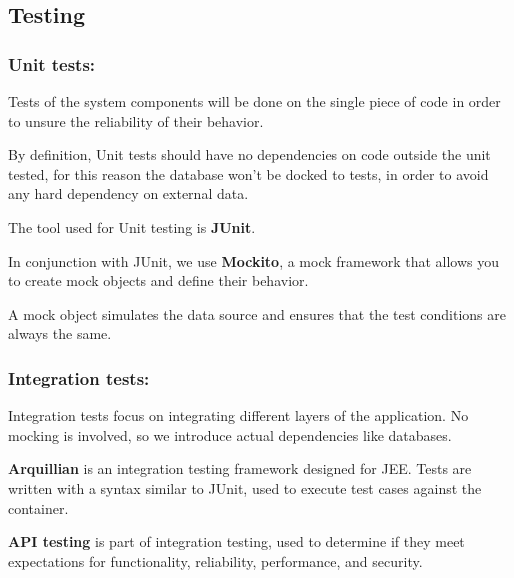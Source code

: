 \newpage

\subsection{Testing}

\subsubsection{Unit tests:}
Tests of the system components will be done on the single piece of code in order to unsure the reliability of their behavior.

By definition, Unit tests should have no dependencies on code outside the unit tested, for this reason the database won’t be docked to tests, in order to avoid any hard dependency on external data.

The tool used for Unit testing is \textbf{JUnit}.

In conjunction with JUnit, we use \textbf{Mockito}, a mock framework that allows you to create mock objects and define their behavior.

A mock object simulates the data source and ensures that the test conditions are always the same.


\subsubsection{Integration tests:}
Integration tests focus on integrating different layers of the application. No mocking is involved, so we introduce actual dependencies like databases.

\textbf{Arquillian} is an integration testing framework designed for JEE. Tests are written with a syntax similar to JUnit, used to execute test cases against the container.

\textbf{API testing} is part of integration testing, used to determine if they meet expectations for functionality, reliability, performance, and security.

